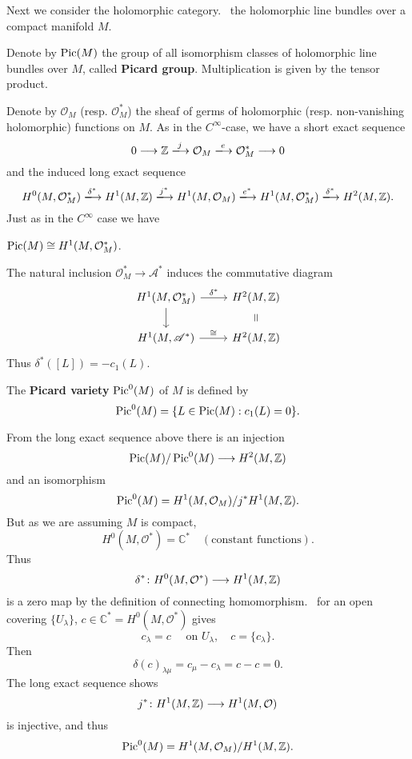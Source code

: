 \documentclass[12pt]{article}
\begin{document}
Next we consider the holomorphic category. \ie\ the holomorphic line bundles over
a compact manifold \(M\).
\begin{definition}
  Denote by \(\operatorname{Pic}(M)\) the group of all isomorphism classes of holomorphic
  line bundles over \(M\), called \textbf{Picard group}. Multiplication is given
  by the tensor product.
\end{definition}
Denote by \(\mathcal{O}_M\) (resp. \(\mathcal{O}_M^*\)) the sheaf of germs of
holomorphic (resp. non-vanishing holomorphic) functions on \(M\). As in the \(C^\infty
\)-case, we have a short exact sequence \[
  0\lrr \mathbb{Z}\xrr{j}\mathcal{O}_M\xrr{e}\mathcal{O}_M^*\lrr 0
\] and the induced long exact sequence \[
  H^0(M,\mathcal{O}_M^*)\xrr{\delta^*}H^1(M,\mathbb{Z})\xrr{j^*}H^1(M,\mathcal{O}_M)
  \xrr{e^*}H^1(M,\mathcal{O}_M^*)\xrr{\delta^*}H^2(M,\mathbb{Z})
.\] Just as in the \(C^\infty\) case we have
\begin{prop}
  \(\operatorname{Pic}(M)\cong H^1(M,\mathcal{O}_M^*)\).
\end{prop}
The natural inclusion \(\mathcal{O}_M^*\to \mathscr{A}^*\) induces the commutative
diagram 
\[\begin{tikzcd}
  {H^1(M,\mathcal{O}_M^*)} & {H^2(M,\mathbb{Z})} \\
  {H^1(M,\mathscr{A}^*)} & {H^2(M,\mathbb{Z})}
	\arrow["{\delta^*}", from=1-1, to=1-2]
	\arrow[from=1-1, to=2-1]
	\arrow["\cong", from=2-1, to=2-2]
	\arrow["{=}"{marking, allow upside down}, draw=none, from=1-2, to=2-2]
\end{tikzcd}\]
Thus \(\delta^*([L])=-c_1(L)\).

\begin{definition}
  The \textbf{Picard variety} \(\operatorname{Pic}^0(M)\) of \(M\) is defined by \[
    \operatorname{Pic}^0(M)=\{L\in \operatorname{Pic}(M):c_1(L)=0\}
  .\]
\end{definition}

From the long exact sequence above there is an injection \[
  \operatorname{Pic}(M)/\operatorname{Pic}^0(M)\longrightarrow H^2(M,\mathbb{Z})
\] and an isomorphism \[
\operatorname{Pic}^0(M)=H^1(M,\mathcal{O}_M)/j^*H^1(M,\mathbb{Z})
.\] But as we are assuming \(M\) is compact, \[
  H^0(M,\mathcal{O}^*)=\mathbb{C}^*\quad (\text{constant functions})
.\] Thus \[
  \delta^*\colon H^0(M,\mathcal{O}^*)\longrightarrow H^1(M,\mathbb{Z})
\] is a zero map by the definition of connecting homomorphism. \ie\ for an open
covering \(\{U_\lambda\}\), \(c\in \mathbb{C}^*=H^0(M,\mathcal{O}^*)\) gives \[
  c_{\lambda}=c\quad\text{ on }U_\lambda,\quad c=\{c_\lambda\}
.\] Then \[
  \delta(c)_{\lambda\mu}=c_\mu-c_\lambda=c-c=0
.\] The long exact sequence shows \[
  j^*\colon H^1(M,\mathbb{Z})\longrightarrow H^1(M,\mathcal{O})
\] is injective, and thus \[
  \operatorname{Pic}^0(M)=H^1(M,\mathcal{O}_M)/H^1(M,\mathbb{Z})
.\] 
\end{document}
